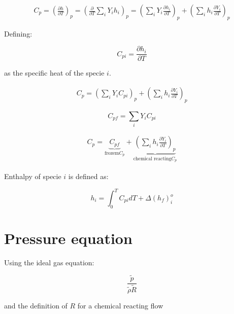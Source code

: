 \documentclass[preprint,12pt,authoryear]{elsarticle}
\begin{document}
\begin{equation}
\begin{split}
C_p
=
\left(\frac{\partial{h}}{\partial{T}}\right)_p
=
\left(\frac{\partial}{\partial{T}}\sum_i Y_ih_i\right)_p
=
\left(\sum_i Y_i\frac{\partial{h_i}}{\partial{T}}\right)_p
+
\left(\sum_i h_i\frac{\partial{Y_i}}{\partial{T}}\right)_p
\end{split}
\end{equation}

Defining: 

\begin{equation}
C_{pi}=\frac{\partial{h_i}}{\partial{T}}
\end{equation}

as the specific heat of the specie $i$.

\begin{equation}
\begin{split}
C_p
=
\left(\sum_i Y_iC_{pi}\right)_p
+
\left(\sum_i h_i\frac{\partial{Y_i}}{\partial{T}}\right)_p
\end{split}
\end{equation}

\begin{equation}
C_{pf}=\sum_iY_iC_{pi}
\end{equation}

\begin{equation}
\begin{split}
C_p
=
\underbrace{
C_{pf}
	    }_{\text{frozem}C_p}
+
\underbrace{
		\left(\sum_i h_i\frac{\partial{Y_i}}{\partial{T}}\right)_p
}_{\text{chemical reacting} C_p}
\end{split}
\end{equation}


Enthalpy of specie $i$ is defined as:

\begin{equation}
	h_i=\int_0^TC_{pi}dT+\Delta(h_f)_i^o
\end{equation}

\section{Pressure equation}


Using the ideal gas equation:

\begin{equation}
                \frac{\tilde{p}}{\tilde{\rho}\tilde{R}}
\end{equation}

and the definition of $R$ for a chemical reacting flow 
\end{document}
